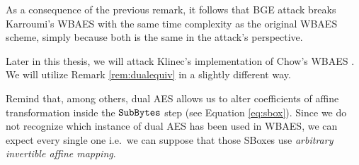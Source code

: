 	As a consequence of the previous remark, it follows that BGE attack breaks Karroumi's WBAES with the same time complexity as the original WBAES scheme, simply because both is the same in the attack's perspective.
	
	\begin{note}
	\label{note:dualsbox}
		Later in this thesis, we will attack Klinec's implementation \cite{klinec2013implementation} of Chow's WBAES \cite{chow2003aes}. We will utilize Remark \ref{rem:dualequiv} in a slightly different way.
		
		Remind that, among others, dual AES allows us to alter coefficients of affine transformation inside the $\texttt{SubBytes}$ step (see Equation \ref{eq:sbox}). Since we do not recognize which instance of dual AES has been used in WBAES, we can expect every single one i.e.\ we can suppose that those SBoxes use {\em arbitrary invertible affine mapping}.
	\end{note}
	

